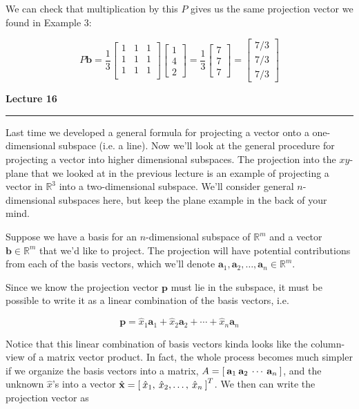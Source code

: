 \documentclass[12pt]{article}
\newcommand{\hs}{\hspace{.75mm}}
\newcommand{\nin}{\noindent}
\newcommand{\vthree}{\vspace{3mm}}
\newcommand{\myb}[1]{\left[ #1 \right]}
\newcommand{\R}[1]{\mathbb{R}^{#1}}
\newcommand{\mymat}[1]{
\left[
\begin{array}{rrrrrrrrrrrrrrrrrrrrrrrrrrrrrrrrrrrrrrr}
#1
\end{array}
\right]
}
\newcommand{\bx}{\mathbf{x}}
\newcommand{\bp}{\mathbf{p}}
\newcommand{\ba}{\mathbf{a}}
\newcommand{\bb}{\mathbf{b}}
\begin{document}
\nin We can check that multiplication by this $P$ gives us the same projection vector we found in Example 3:

\[
P\bb =
\frac{1}{3}
\mymat{
1 & 1 & 1 \\
1 & 1 & 1 \\
1 & 1 & 1 \\
}
\mymat{1 \\ 4 \\ 2}
= \frac{1}{3}
\mymat{
7 \\ 7 \\ 7
}
= \mymat{7/3 \\ 7/3 \\ 7/3}
\]

\clearpage


\nin\Huge{\bf Lecture 16}\normalsize
\vspace{4mm}
\hrule

\vthree

\nin Last time we developed a general formula for projecting a vector onto a one-dimensional subspace (i.e. a line).  Now we'll look at the general procedure for projecting a vector into higher dimensional subspaces.  The projection into the $xy$-plane that we looked at in the previous lecture is an example of projecting a vector in $\R{3}$ into a two-dimensional subspace.  We'll consider general $n$-dimensional subspaces here, but keep the plane example in the back of your mind.

\vthree

\nin Suppose we have a basis for an $n$-dimensional subspace of $\R{m}$ and a vector $\bb \in \R{m}$ that we'd like to project.  The projection will have potential contributions from each of the basis vectors, which we'll denote $\ba_1, \ba_2, \ldots, \ba_n \in \R{m}$.

\vthree

\nin Since we know the projection vector $\bp$ must lie in the subspace, it must be possible to write it as a linear combination of the basis vectors, i.e.

\[
\bp = \hat{x}_1 \ba_1 + \hat{x}_2 \ba_2 + \cdots + \hat{x}_n \ba_n
\]

\vthree

\nin Notice that this linear combination of basis vectors kinda looks like the column-view of a matrix vector product.  In fact, the whole process becomes much simpler if we organize the basis vectors into a matrix, $A = \myb{\hs \ba_1 \hs \ba_2 \hs \cdots \hs \ba_n \hs}$, and the unknown $\hat{x}$'s into a vector $\hat{\bx} = \myb{\hs\hat{x}_1, \hs\hat{x}_2, \ldots, \hs\hat{x}_n\hs}^T$.  We then can write the projection vector as
\end{document}
